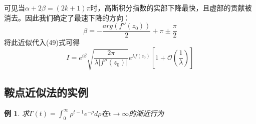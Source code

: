 \documentclass[12pt, a4paper, oneside]{ctexart}
\newtheorem{example}[theorem]{例}
\begin{document}
可见当$\alpha+2\beta=(2k+1)\pi$时，高斯积分指数的实部下降最快，且虚部的贡献被消去。因此我们确定了最速下降的方向：
\begin{equation}
    \beta=-\frac{arg(f''(z_0))}{2}+\pi\pm\frac{\pi}{2}
\end{equation}
将此近似代入(49)式可得
\begin{equation}
    I=e^{i\beta}\sqrt{\frac{2\pi}{\lambda|f''(z_0)|}}e^{\lambda f(z_0)}[1+\mathcal{O}(\frac{1}{\lambda})]
\end{equation}
\subsection{鞍点近似法的实例}
\begin{example}
    求$\Gamma(t)=\int_{0}^{\infty}\rho ^{t-1}e^{-\rho}d\rho$在$t\rightarrow \infty$的渐近行为
\end{example}
\end{document}
